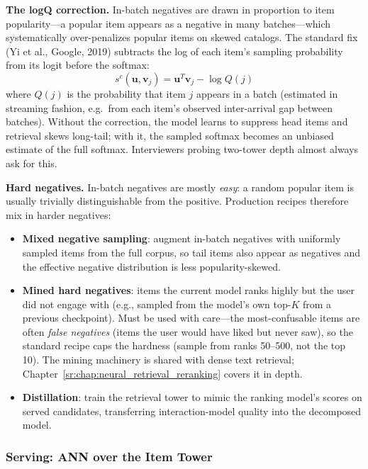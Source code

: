 \textbf{The logQ correction.} In-batch negatives are drawn in proportion to item popularity---a popular item appears as a negative in many batches---which systematically over-penalizes popular items on skewed catalogs. The standard fix (Yi et al., Google, 2019) subtracts the log of each item's sampling probability from its logit before the softmax:
\begin{equation}
s^{c}(\mathbf{u}, \mathbf{v}_j) = \mathbf{u}^T \mathbf{v}_j - \log Q(j)
\end{equation}
where $Q(j)$ is the probability that item $j$ appears in a batch (estimated in streaming fashion, e.g.\ from each item's observed inter-arrival gap between batches). Without the correction, the model learns to suppress head items and retrieval skews long-tail; with it, the sampled softmax becomes an unbiased estimate of the full softmax. Interviewers probing two-tower depth almost always ask for this.

\textbf{Hard negatives.} In-batch negatives are mostly \textit{easy}: a random popular item is usually trivially distinguishable from the positive. Production recipes therefore mix in harder negatives:
\begin{itemize}
    \item \textbf{Mixed negative sampling}: augment in-batch negatives with uniformly sampled items from the full corpus, so tail items also appear as negatives and the effective negative distribution is less popularity-skewed.
    \item \textbf{Mined hard negatives}: items the current model ranks highly but the user did not engage with (e.g., sampled from the model's own top-$K$ from a previous checkpoint). Must be used with care---the most-confusable items are often \textit{false negatives} (items the user would have liked but never saw), so the standard recipe caps the hardness (sample from ranks 50--500, not the top 10). The mining machinery is shared with dense text retrieval; Chapter~\ref{sr:chap:neural_retrieval_reranking} covers it in depth.
    \item \textbf{Distillation}: train the retrieval tower to mimic the ranking model's scores on served candidates, transferring interaction-model quality into the decomposed model.
\end{itemize}

\subsubsection{Serving: ANN over the Item Tower}


